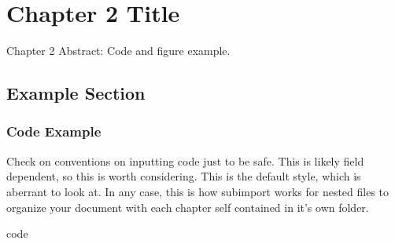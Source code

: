 \chapter{Chapter 2 Title}

\begin{chapterabstract}
Chapter 2 Abstract: Code and figure example.
\end{chapterabstract}

\section{Example Section}

\subsection{Code Example}
Check on conventions on inputting code just to be safe.
This is likely field dependent, so this is worth considering.
This is the default style, which is aberrant to look at.
In any case, this is how subimport works for nested files to organize your document with each chapter self contained in it's own folder.

{code}

